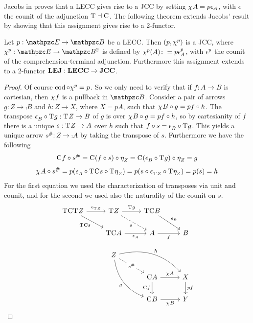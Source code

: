 \documentclass{lmcs} %
\theoremstyle{plain}\newtheorem{satz}[thm]{Satz} %
\begin{document}
Jacobs in \cite[Def.~4.12]{JACOBS1993169} proves that a LECC gives rise to a JCC by setting $\chi^{}A=p\epsilon_A$, with $\epsilon$ the counit of the adjunction $\mathrm{T}^{}\dashv\mathrm{C}^{}$. 
The following theorem extends Jacobs' result by showing that this assignment gives rise to a 2-functor. 

			\begin{thm} \label{thm:l-to-j}
				Let $p:\ct{E}\rightarrow \ct{B}$ be a LECC. Then $(p,\chi^{p})$ is a JCC, where $\jcomp{p}:\ct{E}\rightarrow\Arr{\ct{B}}$ is defined by $\chi^{p}(A)\colon= p\mathrm{\epsilon}^{p}_A$, with $\mathrm{\epsilon}^{p}$ the counit of the comprehension-terminal adjunction. Furthermore this assignment extends to a 2-functor $\mathbf{LEJ}:\mathbf{LECC}\to\mathbf{JCC}$.
			\end{thm}
			
			\begin{proof}
				Of course $\mathop{\mathrm{cod}}\nolimits\circ\chi^{p}=p$. So we only need to verify that if $f:A\to B$ is cartesian, then $\chi^{}f$ is a pullback in $\ct{B}$. Consider a pair of arrows $g:Z\to\comp{}B$ and $h:Z\to X$, where $X=pA$, such that $\chi^{}B\circ g=pf\circ h$. The transpose $\mathrm{\epsilon}^{}_B\circ\mathrm{T}^{}g:\mathrm{T}^{}Z\to B$ of $g$ is over $\chi^{}B\circ g=pf\circ h$, so by cartesianity of $f$ there is a unique $s:\mathrm{T}^{}Z\to A$ over $h$ such that $f\circ s=\mathrm{\epsilon}^{}_B\circ \mathrm{T}^{}g$. This yields a unique arrow $s^{\#}:Z\to \comp{}A$ by taking the transpose of $s$. Furthermore we have the following
				\[\mathrm{C}^{}f\circ s^{\#}=\mathrm{C}^{}(f\circ s)\circ \mathrm{\eta}^{}_Z=\mathrm{C}^{}(\mathrm{\epsilon}^{}_B\circ \mathrm{T}^{}g)\circ\mathrm{\eta}^{}_Z=g\] 
				\[\chi^{}A\circ s^{\#}=p(\mathrm{\epsilon}^{}_A\circ\mathrm{T}^{}\mathrm{C}^{}s\circ\mathrm{T}^{}\mathrm{\eta}^{}_Z)=p(s\circ\mathrm{\epsilon}^{}_{\mathrm{T}^{}Z}\circ\mathrm{T}^{}\mathrm{\eta}^{}_Z)=p(s)=h\]
				For the first equation we used the characterization of transposes via unit and counit, and for the second we used also the naturality of the counit on $s$.
				\[\begin{tikzcd}
					{\term{}\comp{}\term{}Z} & {\term{}Z} & {\term{}\comp{}B} \\
					& {\term{}\comp{}A} & A & B \\
					& Z \\
					&& {\comp{}A} & X \\
					&& {\comp{}B} & Y
					\arrow["{\coun{}_{\term{}Z}}", from=1-1, to=1-2]
					\arrow["{\term{}\comp{}s}"', from=1-1, to=2-2]
					\arrow["{\term{}g}", from=1-2, to=1-3]
					\arrow["s"', dashed, from=1-2, to=2-3]
					\arrow["{\coun{}_B}", from=1-3, to=2-4]
					\arrow["{\coun{}_A}"', from=2-2, to=2-3]
					\arrow["f"', from=2-3, to=2-4]
					\arrow["{s^{\#}}"{description}, dashed, from=3-2, to=4-3]
					\arrow["h", bend left, from=3-2, to=4-4]
					\arrow["g"', bend right, from=3-2, to=5-3]
					\arrow["{\jcomp{}A}", from=4-3, to=4-4]
					\arrow["{\comp{}f}"', from=4-3, to=5-3]
					\arrow["pf", from=4-4, to=5-4]
					\arrow["{\jcomp{}B}"', from=5-3, to=5-4]
				\end{tikzcd}\]
				

\end{proof}
\end{document}
